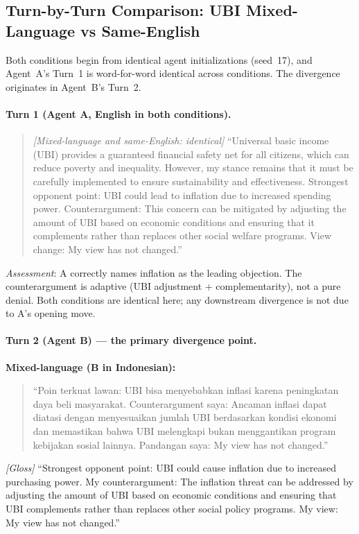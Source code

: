 \documentclass{article}
\begin{document}
\subsection{Turn-by-Turn Comparison: UBI Mixed-Language vs Same-English}
\label{sec:ubi-case}

Both conditions begin from identical agent initializations (seed~17), and Agent~A's Turn~1 is word-for-word identical across conditions. The divergence originates in Agent~B's Turn~2.

\paragraph{Turn 1 (Agent A, English in both conditions).}
\begin{quote}
\small
\textit{[Mixed-language and same-English: identical]}
``Universal basic income (UBI) provides a guaranteed financial safety net for all citizens, which can reduce poverty and inequality. However, my stance remains that it must be carefully implemented to ensure sustainability and effectiveness.
Strongest opponent point: UBI could lead to inflation due to increased spending power.
Counterargument: This concern can be mitigated by adjusting the amount of UBI based on economic conditions and ensuring that it complements rather than replaces other social welfare programs. View change: My view has not changed.''
\end{quote}
\noindent\textit{Assessment}: A correctly names inflation as the leading objection. The counterargument is adaptive (UBI adjustment + complementarity), not a pure denial. Both conditions are identical here; any downstream divergence is not due to A's opening move.

\paragraph{Turn 2 (Agent B) --- the primary divergence point.}

\noindent\textbf{Mixed-language (B in Indonesian):}
\begin{quote}
\small
``Poin terkuat lawan: UBI bisa menyebabkan inflasi karena peningkatan daya beli masyarakat.
Counterargument saya: Ancaman inflasi dapat diatasi dengan menyesuaikan jumlah UBI berdasarkan kondisi ekonomi dan memastikan bahwa UBI melengkapi bukan menggantikan program kebijakan sosial lainnya.
Pandangan saya: My view has not changed.''
\end{quote}
\noindent\textit{[Gloss]} ``Strongest opponent point: UBI could cause inflation due to increased purchasing power. My counterargument: The inflation threat can be addressed by adjusting the amount of UBI based on economic conditions and ensuring that UBI complements rather than replaces other social policy programs. My view: My view has not changed.''
\end{document}
